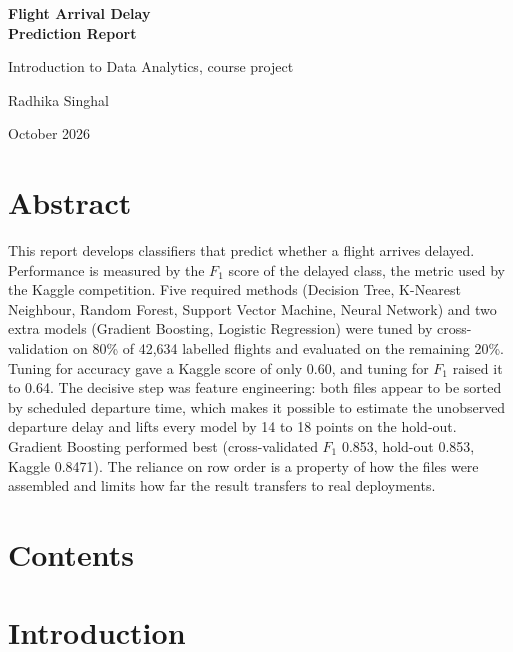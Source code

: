 \documentclass[12pt,a4paper]{article}
\makeatletter
\renewcommand\tableofcontents{\section*{Contents}\begingroup\renewcommand{\baselinestretch}{0.97}\selectfont\renewcommand*\numberline[1]{##1\enspace}\@starttoc{toc}\endgroup}
\newcommand{\Fone}{$F_1$}
\makeatother
\begin{document}
\thispagestyle{cover}
\begin{center}
\sffamily
\vspace*{0.26\textheight}
{\fontsize{32}{38}\selectfont\bfseries Flight Arrival Delay\\Prediction Report\par}
\vspace{16pt}
{\fontsize{15}{20}\selectfont\color{hdrgray} Introduction to Data Analytics, course project\par}
\vspace{40pt}
{\large Radhika Singhal\par}
\vspace{40pt}
{\large\color{hdrgray} October 2026\par}
\end{center}
\clearpage
\twocolumn
\section*{Abstract}
This report develops classifiers that predict whether a flight arrives delayed. Performance is measured by the \Fone{} score of the delayed class, the metric used by the Kaggle competition. Five required methods (Decision Tree, K-Nearest Neighbour, Random Forest, Support Vector Machine, Neural Network) and two extra models (Gradient Boosting, Logistic Regression) were tuned by cross-validation on 80\% of 42,634 labelled flights and evaluated on the remaining 20\%. Tuning for accuracy gave a Kaggle score of only 0.60, and tuning for \Fone{} raised it to 0.64. The decisive step was feature engineering: both files appear to be sorted by scheduled departure time, which makes it possible to estimate the unobserved departure delay and lifts every model by 14 to 18 points on the hold-out. Gradient Boosting performed best (cross-validated \Fone{} 0.853, hold-out 0.853, Kaggle 0.8471). The reliance on row order is a property of how the files were assembled and limits how far the result transfers to real deployments.

\tableofcontents
\vspace{4pt}
\section{Introduction}
\end{document}
